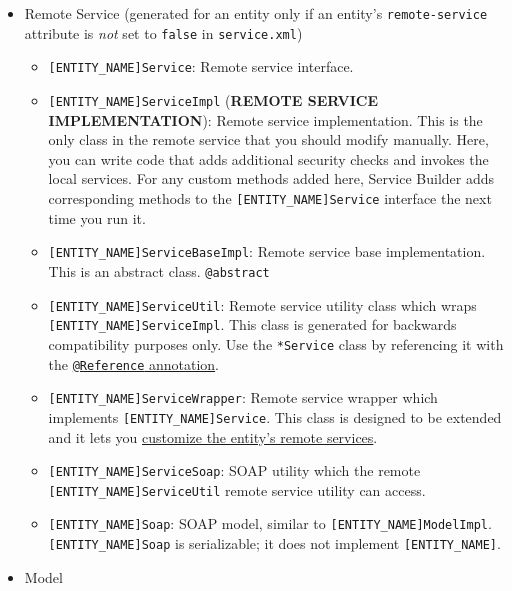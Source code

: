 \begin{itemize}
\tightlist
\item
  Remote Service (generated for an entity only if an entity's
  \texttt{remote-service} attribute is \emph{not} set to \texttt{false}
  in \texttt{service.xml})

  \begin{itemize}
  \tightlist
  \item
    \texttt{{[}ENTITY\_NAME{]}Service}: Remote service interface.
  \item
    \texttt{{[}ENTITY\_NAME{]}ServiceImpl} (\textbf{REMOTE SERVICE
    IMPLEMENTATION}): Remote service implementation. This is the only
    class in the remote service that you should modify manually. Here,
    you can write code that adds additional security checks and invokes
    the local services. For any custom methods added here, Service
    Builder adds corresponding methods to the
    \texttt{{[}ENTITY\_NAME{]}Service} interface the next time you run
    it.
  \item
    \texttt{{[}ENTITY\_NAME{]}ServiceBaseImpl}: Remote service base
    implementation. This is an abstract class. \texttt{@abstract}
  \item
    \texttt{{[}ENTITY\_NAME{]}ServiceUtil}: Remote service utility class
    which wraps \texttt{{[}ENTITY\_NAME{]}ServiceImpl}. This class is
    generated for backwards compatibility purposes only. Use the
    \texttt{*Service} class by referencing it with the
    \href{/docs/7-2/frameworks/-/knowledge_base/f/declarative-services}{\texttt{@Reference}
    annotation}.
  \item
    \texttt{{[}ENTITY\_NAME{]}ServiceWrapper}: Remote service wrapper
    which implements \texttt{{[}ENTITY\_NAME{]}Service}. This class is
    designed to be extended and it lets you
    \href{/docs/7-2/customization/-/knowledge_base/c/overriding-service-builder-services-service-wrappers}{customize
    the entity's remote services}.
  \item
    \texttt{{[}ENTITY\_NAME{]}ServiceSoap}: SOAP utility which the
    remote \texttt{{[}ENTITY\_NAME{]}ServiceUtil} remote service utility
    can access.
  \item
    \texttt{{[}ENTITY\_NAME{]}Soap}: SOAP model, similar to
    \texttt{{[}ENTITY\_NAME{]}ModelImpl}.
    \texttt{{[}ENTITY\_NAME{]}Soap} is serializable; it does not
    implement \texttt{{[}ENTITY\_NAME{]}}.
  \end{itemize}
\item
  Model


\end{itemize}
